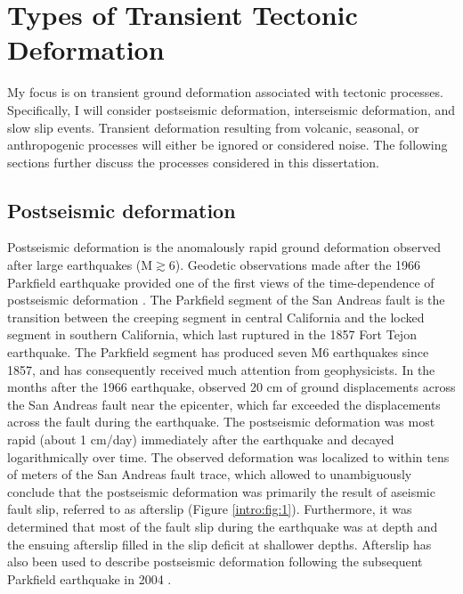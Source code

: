 \section{Types of Transient Tectonic Deformation}
My focus is on transient ground deformation associated with tectonic
processes. Specifically, I will consider postseismic deformation,
interseismic deformation, and slow slip events. Transient deformation
resulting from volcanic, seasonal, or anthropogenic processes will
either be ignored or considered noise. The following sections further
discuss the processes considered in this dissertation.

\subsection{Postseismic deformation}

Postseismic deformation is the anomalously rapid ground deformation
observed after large earthquakes (M${\gtrsim}$6). Geodetic
observations made after the 1966 Parkfield earthquake provided one of
the first views of the time-dependence of postseismic deformation
\citep{Smith1968}. The Parkfield segment of the San Andreas fault is
the transition between the creeping segment in central California and
the locked segment in southern California, which last ruptured in the
1857 Fort Tejon earthquake. The Parkfield segment has produced seven
M6 earthquakes since 1857, and has consequently received much
attention from geophysicists. In the months after the 1966 earthquake,
\citet{Smith1968} observed 20 cm of ground displacements across the
San Andreas fault near the epicenter, which far exceeded the
displacements across the fault during the earthquake. The postseismic
deformation was most rapid (about 1 cm/day) immediately after the
earthquake and decayed logarithmically over time. The observed
deformation was localized to within tens of meters of the San Andreas
fault trace, which allowed \citet{Smith1968} to unambiguously conclude
that the postseismic deformation was primarily the result of aseismic
fault slip, referred to as afterslip (Figure \ref{intro:fig:1}).
Furthermore, it was determined that most of the fault slip during the
earthquake was at depth and the ensuing afterslip filled in the slip
deficit at shallower depths. Afterslip has also been used to describe
postseismic deformation following the subsequent Parkfield earthquake
in 2004 \citep{Freed2007}.

